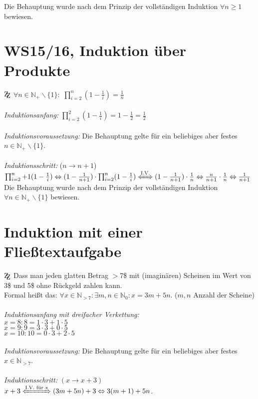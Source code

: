 \documentclass[11pt]{article} %
\newcommand{\zz}{\mathrm{Z\kern-.3em\raise-0.5ex\hbox{Z}}} %
\begin{document}
Die Behauptung wurde nach dem Prinzip der vollständigen Induktion $\forall n \geq 1$ bewiesen.



\section{WS15/16, Induktion über Produkte}
$\zz$ $ \forall n \in \mathbb{N}_+ \backslash \{1\}:$ $\prod_{i=2}^n (1 - \frac{1}{i} ) = \frac{1}{n}$\\
\ \\
\emph{Induktionsanfang:} $\prod_{i=2}^2 (1 - \frac{1}{i} ) = 1 - \frac{1}{2} = \frac{1}{2}$\\
\ \\
\emph{Induktionsvoraussetzung:} Die Behauptung gelte für ein beliebiges aber festes $n \in \mathbb{N}_+ \backslash \{1\}$.\\
\ \\
\emph{Induktionsschritt:} ($n \rightarrow n+1$)\\
$\prod_{i=2}^n+1 (1 - \frac{1}{i} ) \Leftrightarrow (1- \frac{1}{n+1}) \cdot \prod_{i=2}^n (1 - \frac{1}{i} ) \xLeftrightarrow{\text{I.V.}} (1- \frac{1}{n+1}) \cdot \frac{1}{n} \Leftrightarrow \frac{n}{n+1} \cdot \frac{1}{n} \Leftrightarrow \frac{1}{n+1}$\\

Die Behauptung wurde nach dem Prinzip der vollständigen Induktion $\forall n \in \mathbb{N}_+ \backslash \{1\}$ bewiesen.



\section{Induktion mit einer Fließtextaufgabe}
$\zz$ Dass man jeden glatten Betrag $>$7\$ mit (imaginären) Scheinen im Wert von 3\$ und 5\$ ohne Rückgeld zahlen kann.\\
Formal heißt das: $\forall x \in \mathbb{N}_{>7}: \exists m,n \in \mathbb{N}_0: x = 3 m + 5 n$. ($m,n$ Anzahl der Scheine)\\
\ \\
\emph{Induktionsanfang mit dreifacher Verkettung:}\\
$x=8:     8=1 \cdot 3 + 1 \cdot 5$\\
$x=9:     9=3 \cdot 3 + 0 \cdot 5$\\
$x=10: 10=0 \cdot 3 + 2 \cdot 5$\\
\ \\
\emph{Induktionsvoraussetzung:} Die Behauptung gelte für ein beliebiges aber festes $x \in \mathbb{N}_{>7}$.\\
\ \\
\emph{Induktionsschritt:} $(x \rightarrow x+3)$\\
$x+3 \xLeftrightarrow{\text{I.V. für x}} (3m + 5n) + 3 \Leftrightarrow 3(m+1) + 5n$.\\
\end{document}
